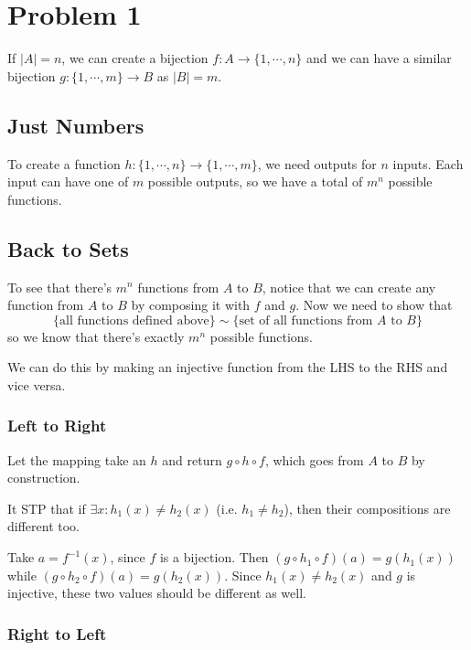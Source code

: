 \documentclass[12pt]{article}
\begin{document}
\section{Problem 1}

If $|A|=n$, we can create a bijection $f: A \to \{1, \cdots, n\}$
and we can have a similar bijection $g: \{1, \cdots, m\} \to B$ as $|B|=m$.

\subsection{Just Numbers}

To create a function $h: \{1, \cdots, n\} \to \{1, \cdots, m\}$, we need outputs for $n$ inputs.
Each input can have one of $m$ possible outputs, so we have a total of $m^n$ possible functions.

\subsection{Back to Sets}

To see that there's $m^n$ functions from $A$ to $B$,
notice that we can create any function from $A$ to $B$ by composing
it with $f$ and $g$.
Now we need to show that
\[\{\text{all functions defined above}\} \sim \{\text{set of all functions from $A$ to $B$}\}\]
so we know that there's exactly $m^n$ possible functions.

We can do this by making an injective function from the LHS to the RHS and vice versa.

\subsubsection{Left to Right}

Let the mapping take an $h$ and return $g \circ h \circ f$, which goes from $A$ to $B$ by construction.

It STP that if $\exists x: h_1(x) \ne h_2(x)$ (i.e. $h_1 \ne h_2$),
then their compositions are different too.

Take $a=f^{-1}(x)$, since $f$ is a bijection.
Then $(g \circ h_1 \circ f)(a)=g(h_1(x))$ while $(g \circ h_2 \circ f)(a)=g(h_2(x))$.
Since $h_1(x) \ne h_2(x)$ and $g$ is injective, these two values should be different as well.

\subsubsection{Right to Left}
\end{document}
